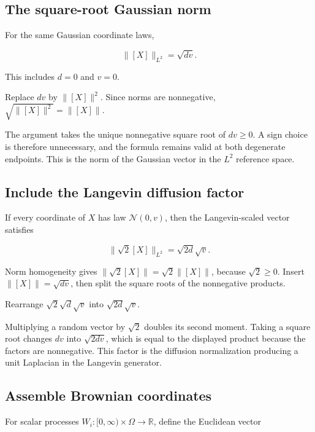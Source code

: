 \documentclass[11pt,a4paper]{article}
\begin{document}
\subsection{\texorpdfstring{The square-root Gaussian norm}{The square-root Gaussian norm}}


For the same Gaussian coordinate laws,

\[\|[X]\|_{L^2}=\sqrt{dv}.\]

This includes \(d=0\) and \(v=0\).



Replace \(dv\) by \(\|[X]\|^2\). Since norms are nonnegative, \(\sqrt{\|[X]\|^2}=\|[X]\|\).



The argument takes the unique nonnegative square root of \(dv\ge0\). A sign choice is therefore unnecessary, and the formula remains valid at both degenerate endpoints. This is the norm of the Gaussian vector in the \(L^2\) reference space.


\subsection{\texorpdfstring{Include the Langevin diffusion factor}{Include the Langevin diffusion factor}}


If every coordinate of \(X\) has law \(\mathcal N(0,v)\), then the Langevin-scaled vector satisfies

\[\|\sqrt2[X]\|_{L^2}=\sqrt{2d}\sqrt v.\]

Norm homogeneity gives \(\|\sqrt2[X]\|=\sqrt2\|[X]\|\), because \(\sqrt2\ge0\). Insert \(\|[X]\|=\sqrt{dv}\), then split the square roots of the nonnegative products.



Rearrange \(\sqrt2\sqrt d\sqrt v\) into \(\sqrt{2d}\sqrt v\).



Multiplying a random vector by \(\sqrt2\) doubles its second moment. Taking a square root changes \(dv\) into \(\sqrt{2dv}\), which is equal to the displayed product because the factors are nonnegative. This factor is the diffusion normalization producing a unit Laplacian in the Langevin generator.


\subsection{\texorpdfstring{Assemble Brownian coordinates}{Assemble Brownian coordinates}}


For scalar processes \(W_i:[0,\infty)\times\Omega\to\mathbb R\), define the Euclidean vector
\end{document}
